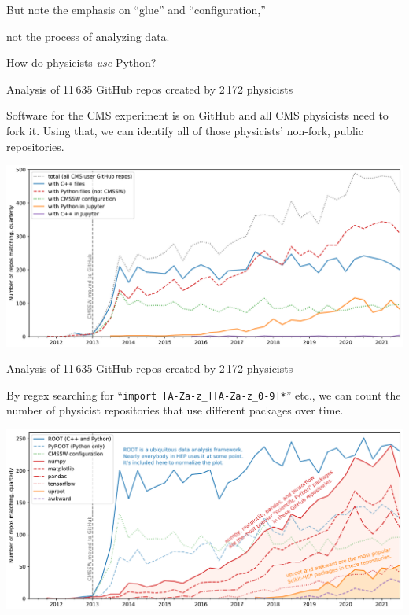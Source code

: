 \documentclass[aspectratio=169]{beamer}
\begin{document}
\begin{frame}{}
\vspace{1 cm}
\Large

\begin{center}
But note the emphasis on ``glue'' and ``configuration,''

\vspace{0.1 cm}
not the process of analyzing data.

\vspace{1 cm}
How do physicists {\it use} Python?
\end{center}
\end{frame}

\begin{frame}{Analysis of 11\,635 GitHub repos created by 2\,172 physicists}
\vspace{0.25 cm}

Software for the CMS experiment is on GitHub and all CMS physicists need to fork it. Using that, we can identify all of those physicists' non-fork, public repositories.

\vspace{0.2 cm}

\includegraphics[width=\linewidth]{PLOTS/gihub-language-fullstudy.pdf}
\end{frame}

\begin{frame}{Analysis of 11\,635 GitHub repos created by 2\,172 physicists}
\vspace{0.25 cm}

By regex searching for ``\texttt{import [A-Za-z_][A-Za-z_0-9]*}'' etc., we can count the number of physicist repositories that use different packages over time.

\vspace{0.2 cm}

\includegraphics[width=\linewidth]{PLOTS/gihub-package-fullstudy.pdf}
\end{frame}
\end{document}

